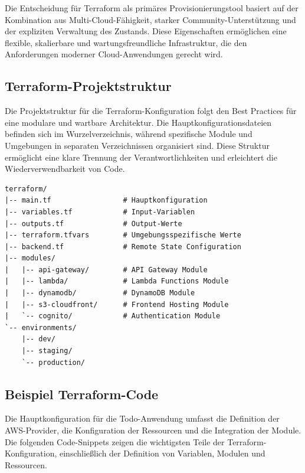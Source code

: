 Die Entscheidung für Terraform als primäres Provisionierungstool basiert auf der Kombination aus
Multi-Cloud-Fähigkeit, starker Community-Unterstützung und der expliziten Verwaltung des Zustands.
Diese Eigenschaften ermöglichen eine flexible, skalierbare und wartungsfreundliche Infrastruktur,
die den Anforderungen moderner Cloud-Anwendungen gerecht wird.


\subsection{Terraform-Projektstruktur}
Die Projektstruktur für die Terraform-Konfiguration folgt den Best Practices
für eine modulare und wartbare Architektur. Die Hauptkonfigurationsdateien befinden sich im
Wurzelverzeichnis, während spezifische Module und Umgebungen in separaten Verzeichnissen organisiert
sind. Diese Struktur ermöglicht eine klare Trennung der Verantwortlichkeiten und erleichtert die
Wiederverwendbarkeit von Code.

\newpage
\begin{lstlisting}[style=terraform, caption=Terraform Projektstruktur]
terraform/
|-- main.tf                 # Hauptkonfiguration
|-- variables.tf            # Input-Variablen
|-- outputs.tf              # Output-Werte
|-- terraform.tfvars        # Umgebungsspezifische Werte
|-- backend.tf              # Remote State Configuration
|-- modules/
|   |-- api-gateway/        # API Gateway Module
|   |-- lambda/             # Lambda Functions Module
|   |-- dynamodb/           # DynamoDB Module
|   |-- s3-cloudfront/      # Frontend Hosting Module
|   `-- cognito/            # Authentication Module
`-- environments/
    |-- dev/
    |-- staging/
    `-- production/
\end{lstlisting}

\subsection{Beispiel Terraform-Code}

Die Hauptkonfiguration für die Todo-Anwendung umfasst die Definition der AWS-Provider,
die Konfiguration der Ressourcen und die Integration der Module. Die folgenden Code-Snippets
zeigen die wichtigsten Teile der Terraform-Konfiguration, einschließlich der Definition von
Variablen, Modulen und Ressourcen.

